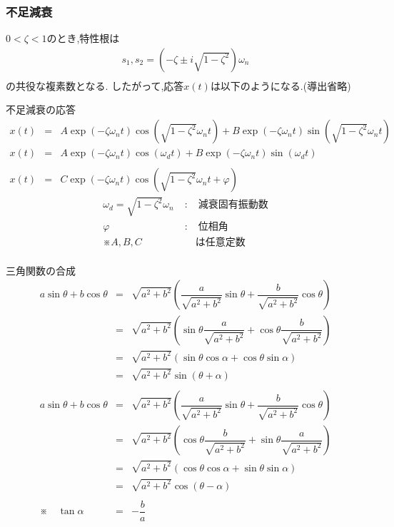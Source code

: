 \documentclass[a4paper]{jsarticle}
\begin{document}
\subsubsection{不足減衰}
$0<\zeta<1$のとき,特性根は
\begin{eqnarray*}
    s_1,s_2=\left(-\zeta \pm i\sqrt{1-\zeta^2}\right)\omega_n\\
\end{eqnarray*}
の共役な複素数となる.
したがって,応答$x\left(t\right)$は以下のようになる.(導出省略)
\begin{itembox}[l]{不足減衰の応答}
    \begin{eqnarray*}
        x\left(t\right)&=&A\exp{\left(-\zeta \omega_nt\right)}\cos{\left(\sqrt{1-\zeta^2}\omega_nt\right)}+B\exp{\left(-\zeta \omega_nt\right)}\sin{\left(\sqrt{1-\zeta^2}\omega_nt\right)}\\
        x\left(t\right)&=&A\exp{\left(-\zeta \omega_nt\right)}\cos{\left(\omega_dt\right)}+B\exp{\left(-\zeta \omega_nt\right)}\sin{\left(\omega_dt\right)}\\
        \\
        x\left(t\right)&=&C\exp{\left(-\zeta \omega_nt\right)}\cos\left(\sqrt{1-\zeta^2}\omega_nt+\varphi\right)
    \end{eqnarray*}
    \begin{eqnarray*}
        \omega_d=\sqrt{1-\zeta^2}\omega_n\;&:&\;減衰固有振動数\\
        \varphi\;&:&\;位相角\\
        ※ A,B,C&&は任意定数\\
    \end{eqnarray*}
\end{itembox}
\begin{itembox}[l]{三角関数の合成}
    \begin{eqnarray*}
        a\sin\theta+b\cos\theta
        &=&\sqrt{a^2+b^2}\left(\dfrac{a}{\sqrt{a^2+b^2}}\sin\theta+\dfrac{b}{\sqrt{a^2+b^2}}\cos\theta\right)\\
        &=&\sqrt{a^2+b^2}\left(\sin\theta\dfrac{a}{\sqrt{a^2+b^2}}+\cos\theta\dfrac{b}{\sqrt{a^2+b^2}}\right)\\
        &=&\sqrt{a^2+b^2}\left(\sin\theta\cos\alpha+\cos\theta\sin\alpha\right)\\
        &=&\sqrt{a^2+b^2}\sin\left(\theta+\alpha\right)\\
        \\
        a\sin\theta+b\cos\theta
        &=&\sqrt{a^2+b^2}\left(\dfrac{a}{\sqrt{a^2+b^2}}\sin\theta+\dfrac{b}{\sqrt{a^2+b^2}}\cos\theta\right)\\
        &=&\sqrt{a^2+b^2}\left(\cos\theta\dfrac{b}{\sqrt{a^2+b^2}}+\sin\theta\dfrac{a}{\sqrt{a^2+b^2}}\right)\\
        &=&\sqrt{a^2+b^2}\left(\cos\theta\cos\alpha+\sin\theta\sin\alpha\right)\\
        &=&\sqrt{a^2+b^2}\cos\left(\theta-\alpha\right)\\
        \\
        ※\quad\tan\alpha &=& -\dfrac{b}{a}
    \end{eqnarray*}
\end{itembox}
\end{document}
